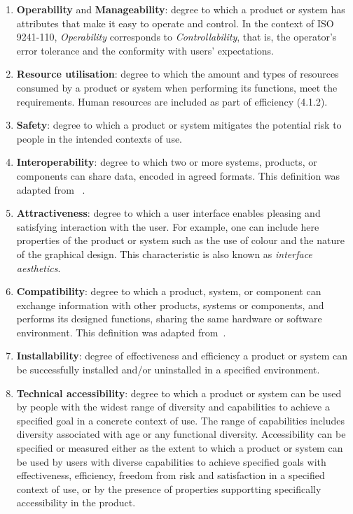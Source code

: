 \begin{enumerate}
    \item \textbf{Operability} and \textbf{Manageability}: degree to which a product or system has attributes that make it easy to operate and control. In the context of ISO 9241-110, \textit{Operability} corresponds to \textit{Controllability}, that is, the operator's error tolerance and the conformity with users' expectations.

    \item \textbf{Resource utilisation}: degree to which the amount and types of resources consumed by a product or system when performing its functions, meet the requirements. Human resources are included as part of efficiency (4.1.2).

    \item \textbf{Safety}: degree to which a product or system mitigates the potential risk to people  in the intended contexts of use.

    \item \textbf{Interoperability}: degree to which two or more systems, products, or components can share data, encoded in agreed formats. This definition was adapted from ~\cite{iso_central_secretary_isoiecieee_2010}.

    \item \textbf{Attractiveness}: degree to which a user interface enables pleasing and satisfying interaction with the user. For example, one can include here properties of the product or system such as the use of colour and the nature of the graphical design. This characteristic is also known as \textit{interface aesthetics}.

    \item \textbf{Compatibility}: degree to which a product, system, or component can exchange information with other products, systems or components, and performs its designed functions, sharing the same hardware or software environment. This definition was adapted from~\cite{iso_central_secretary_isoiecieee_2010}. 

    \item \textbf{Installability}: degree of effectiveness and efficiency a product or system can be successfully installed and/or uninstalled  in a specified environment.

    \item \textbf{Technical accessibility}: degree to which a product or system can be used by people with the widest range of diversity and capabilities to achieve a specified goal in a concrete context of use. The range of capabilities includes diversity associated with age or any functional diversity. Accessibility can be specified or measured either as the extent to which a product or system can be used by users with diverse capabilities to achieve specified goals with effectiveness, efficiency, freedom from risk and satisfaction in a specified context of use, or by the presence of properties supportting specifically accessibility in the product.


\end{enumerate}
